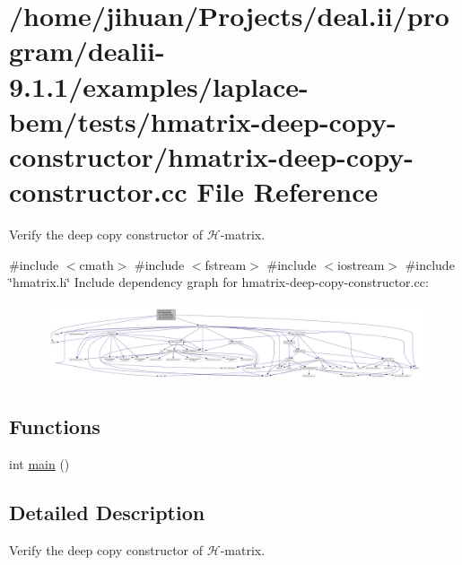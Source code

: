 \hypertarget{hmatrix-deep-copy-constructor_8cc}{}\section{/home/jihuan/\+Projects/deal.ii/program/dealii-\/9.1.1/examples/laplace-\/bem/tests/hmatrix-\/deep-\/copy-\/constructor/hmatrix-\/deep-\/copy-\/constructor.cc File Reference}
\label{hmatrix-deep-copy-constructor_8cc}


Verify the deep copy constructor of $\mathcal{H}$-\/matrix.  


{\ttfamily \#include $<$cmath$>$}\newline
{\ttfamily \#include $<$fstream$>$}\newline
{\ttfamily \#include $<$iostream$>$}\newline
{\ttfamily \#include \char`\"{}hmatrix.\+h\char`\"{}}\newline
Include dependency graph for hmatrix-\/deep-\/copy-\/constructor.cc\+:
\nopagebreak
\begin{figure}[H]
\begin{center}
\leavevmode
\includegraphics[width=350pt]{hmatrix-deep-copy-constructor_8cc__incl}
\end{center}
\end{figure}
\subsection*{Functions}
\begin{DoxyCompactItemize}
\item 
int \hyperlink{hmatrix-deep-copy-constructor_8cc_ae66f6b31b5ad750f1fe042a706a4e3d4}{main} ()
\end{DoxyCompactItemize}


\subsection{Detailed Description}
Verify the deep copy constructor of $\mathcal{H}$-\/matrix. 

